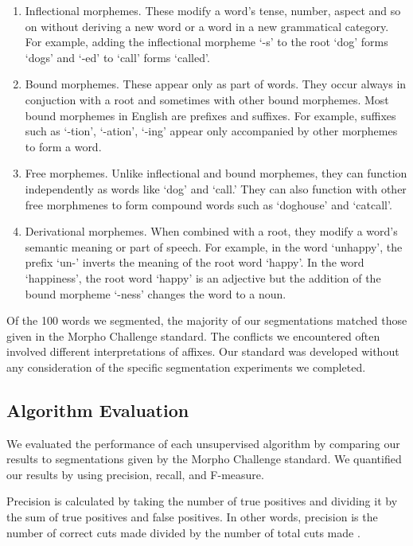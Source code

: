 \documentclass[11pt,letterpaper]{article}
\begin{document}
\begin{enumerate}
\item Inflectional morphemes. These modify a word's tense, number, aspect and so on without deriving a new word or a word in a new grammatical category. For example, adding the inflectional morpheme `-s' to the root `dog' forms `dogs' and `-ed' to `call' forms `called'. 
\item Bound morphemes. These appear only as part of words. They occur always in conjuction with a root and sometimes with other bound morphemes. Most bound morphemes in English are prefixes and suffixes. For example, suffixes such as `-tion', `-ation', `-ing' appear only accompanied by other morphemes to form a word. 
\item Free morphemes. Unlike inflectional and bound morphemes, they can function independently as words like `dog' and `call.' They can also function with other free morphmenes to form compound words such as `doghouse' and `catcall'.
\item Derivational morphemes. When combined with a root, they modify a word's semantic meaning or part of speech. For example, in the word `unhappy', the prefix `un-' inverts the meaning of the root word `happy'. In the word `happiness', the root word `happy' is an adjective but the addition of the bound morpheme `-ness' changes the word to a noun.
\end{enumerate}

Of the 100 words we segmented, the majority of our segmentations matched those given in the Morpho Challenge standard. The conflicts we encountered often involved different interpretations of affixes. Our standard was developed without any consideration of the specific segmentation experiments we completed.

\subsection{Algorithm Evaluation}
We evaluated the performance of each unsupervised algorithm by comparing our results to segmentations given by the Morpho Challenge standard. We quantified our results by using precision, recall, and F-measure. \par

Precision is calculated by taking the number of true positives and dividing it by the sum of true positives and false positives. In other words, precision is the number of correct cuts made divided by the number of total cuts made \cite{hafer1974-word}.
\end{document}
